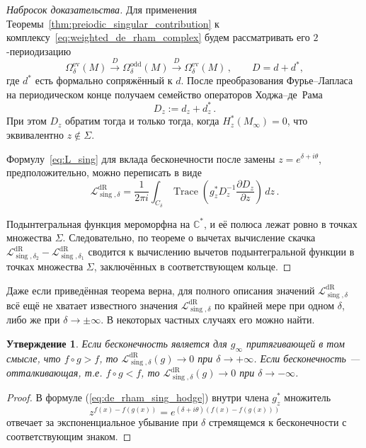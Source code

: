 \documentclass[a4paper, 12pt]{article}
\newtheorem{proposition}[theorem]{Утверждение}
\theoremstyle{definition}
\begin{document}
\begin{proof}[Набросок доказательства]
    Для применения Теоремы~\ref{thm:preiodic_singular_contribution} к комплексу~\eqref{eq:weighted_de_rham_complex}
    будем рассматривать его \(2\)-периодизацию \[
        \Omega^{\operatorname{ev}}_{\delta}(M) \overset{D}{\longrightarrow} \Omega^{\operatorname{odd}}_{\delta}(M) \overset{D}{\longrightarrow} \Omega^{\operatorname{ev}}_{\delta}(M)\,,
        \qquad
        D = d + d^*,
    \] где \(d^*\) есть формально сопряжённый к \(d\).
    После преобразования Фурье--Лапласа на периодическом
    конце получаем семейство операторов Ходжа--де~Рама
    \[
        D_z := d_z + d_z^*\,.
    \]
    При этом \(D_z\) обратим тогда и только тогда, когда \(H_z^*(M_\infty)=0\), что эквивалентно \({ z \not \in \Sigma }\).

    Формулу~\eqref{eq:L_sing} для вклада бесконечности после замены \({ z = e^{\delta + i \theta} }\), предположительно, можно переписать в виде
    \begin{equation}
        \label{eq:de_rham_sing_hodge}
        \mathcal L^{\operatorname{dR}}_{\operatorname{sing},\delta} =
        \frac{1}{2\pi i} \int_{C_\delta} \operatorname{Trace} \left(
            g_z^* D_z^{-1}\frac{\partial D_z}{\partial z}
        \right)\,dz\,.
    \end{equation}

    Подынтегральная функция мероморфна на \(\mathbb C^*\), и её полюса лежат ровно в точках множества \(\Sigma\). Следовательно, по теореме о вычетах вычисление скачка \({ \mathcal L^{\operatorname{dR}}_{\operatorname{sing},\delta_2} - \mathcal L^{\operatorname{dR}}_{\operatorname{sing},\delta_1} }\) сводится к вычислению вычетов подынтегральной функции в точках множества \({ \Sigma }\), заключённых в соответствующем кольце.
\end{proof}

Даже если приведённая теорема верна, для полного описания значений \({ \mathcal L^{\operatorname{dR}}_{\operatorname{sing}, \delta} }\) всё ещё не хватает известного значения \({ \mathcal L^{\operatorname{dR}}_{\operatorname{sing}, \delta} }\) по крайней мере при одном \({ \delta }\), либо же при \({ \delta \to \pm \infty }\). В некоторых частных случаях его можно найти.

\begin{proposition}
    Если бесконечность является для \({ g_{\infty} }\) притягивающей в том смысле, что \({ f \circ g > f }\), то \({ \mathcal L_{\operatorname{sing}, \delta}^{\operatorname{dR}}(g) \to 0 }\) при \({ \delta \to +\infty }\). Если бесконечность --- отталкивающая, т.е. \({ f \circ g < f }\), то \({ \mathcal L_{\operatorname{sing}, \delta}^{\operatorname{dR}}(g) \to 0 }\) при \({ \delta \to -\infty }\).
\end{proposition}

\begin{proof}
    В формуле (\ref{eq:de_rham_sing_hodge}) внутри члена \({ g^{*}_{z} }\) множитель \[
        z^{f(x) - f(g(x))} = e^{(\delta + i\theta)(f(x) - f(g(x)))}
    \] отвечает за экспоненциальное убывание при \({ \delta }\) стремящемся к бесконечности с соответствующим знаком.
\end{proof}

\printbibliography
\end{document}
